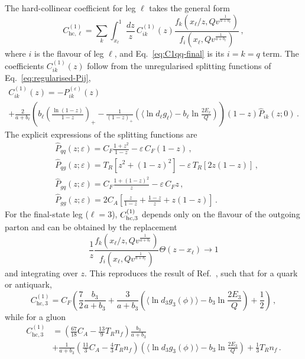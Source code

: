 The hard-collinear coefficient for leg $\ell$ takes the general form
  \begin{equation}
    \label{eq:Cell-ISR}
    C_{\mathrm{hc},\ell}^{(1)} = \sum_k  \int_{x_\ell}^1\frac{dz}{z}\,C_{ik}^{(1)}(z) \frac{f_k(x_\ell/z,Qv^{\frac{1}{a+b_\ell}})}{f_i(x_\ell,Qv^{\frac{1}{a+b_\ell}})}\,,
  \end{equation}
  where $i$ is the flavour of leg $\ell$, and Eq.~\eqref{eq:C1qq-final}
is its $i=k=q$ term. The coefficients $C_{ik}^{(1)}(z)$ follow from the unregularised splitting functions of Eq.~\eqref{eq:regularised-Pij},
  \begin{multline}
    \label{eq:Cij-ISR}
    C_{ik}^{(1)}(z) = - P_{ik}^{(\varepsilon)}(z) \\ +\frac{2 }{a+b_\ell}\left(b_\ell\left(\frac{\ln(1-z)}{1-z}\right)_+-\frac{1}{(1-z)_+}
      \left(\langle\ln d_\ell g_\ell\rangle-b_\ell \ln\frac{2E_\ell}{Q}\right)\right)(1-z)\hat P_{ik}(z;0)\,.
  \end{multline}
  The explicit expressions of the splitting
  functions are
  \begin{subequations}
  	\begin{align}
	& \hat P_{qq}(z;\varepsilon)=C_F \frac{1+z^2}{1-z}-\varepsilon\,C_F (1-z)\,,\\
	& \hat P_{qg}(z;\varepsilon)=T_R \left[z^2+(1-z)^2\right]-\varepsilon\,T_R\left[2z(1-z)\right]\,, \\
	  \label{eq:Pgq-epsilon}
	& \hat P_{gq}(z;\varepsilon) =C_F \frac{1 + (1-z)^2}{z} - \varepsilon\,C_Fz \,, \\
	 \label{eq:Pgg-epsilon}
	& \hat P_{gg}(z;\varepsilon) =2C_A\left[\frac{z}{1-z} + \frac{1-z}{z} + z(1-z)\right]\,.
	\end{align}
  \end{subequations}
  For the final-state leg ($\ell=3$), $C^{(1)}_{{\rm hc},3}$ depends
  only on the flavour of the outgoing parton and can be obtained by
  the replacement
  \begin{equation}
    \label{eq:C-recovery}
    \frac{1}{z}\frac{f_k(x_\ell/z,Qv^{\frac{1}{a+b_\ell}})}{f_i(x_\ell,Qv^{\frac{1}{a+b_\ell}})}\Theta(z-x_\ell)\to 1
  \end{equation}
  and integrating over $z$. This reproduces the result of Ref.~\cite{Arpino:2019ozn},
  such that for a quark or antiquark,
  \begin{equation}
    \label{eq:C1hc-q}
    C_{\mathrm{hc},3}^{(1)}=C_F\left(\frac{7}{2}\frac{b_3}{a+b_3}+\frac{3}{a+b_3}\left(\langle \ln d_3 g_3(\phi)\rangle-b_3\ln\frac{2E_3}{Q}\right)+\frac 12\right)\,,
  \end{equation}
  while for a gluon
  \begin{equation}
    \label{eq:C1hc-g}
    \begin{split}
    C_{\mathrm{hc},3}^{(1)}& =\left(\frac{67}{18}C_A-\frac{13}{9}T_R n_f\right)\frac{b_3}{a+b_3}\\ & +\frac{1}{a+b_3}\left(\frac{11}{3}C_A-\frac{4}{3}T_R n_f\right)\left(\langle \ln d_3 g_3(\phi)\rangle-b_3\ln\frac{2E_3}{Q}\right)+\frac{1}{3}T_R n_f\,.
    \end{split}
  \end{equation}

